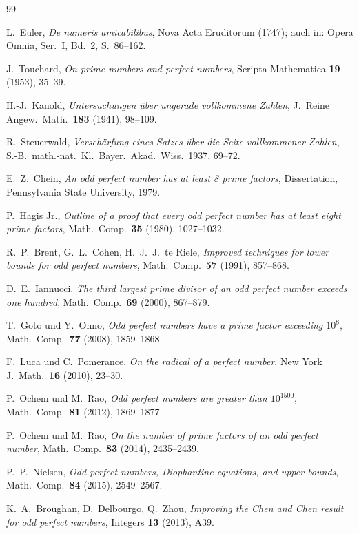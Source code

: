 \documentclass[12pt,a4paper]{amsart}
\theoremstyle{definition}
\theoremstyle{remark}
\begin{document}
\begin{thebibliography}{99}

L.\ Euler,
\textit{De numeris amicabilibus},
Nova Acta Eruditorum (1747);
auch in: Opera Omnia, Ser.\ I, Bd.\ 2, S.\ 86--162.

J.\ Touchard,
\textit{On prime numbers and perfect numbers},
Scripta Mathematica \textbf{19} (1953), 35--39.

H.-J.\ Kanold,
\textit{Untersuchungen über ungerade vollkommene Zahlen},
J.\ Reine Angew.\ Math.\ \textbf{183} (1941), 98--109.

R.\ Steuerwald,
\textit{Verschärfung eines Satzes über die Seite vollkommener Zahlen},
S.-B.\ math.-nat.\ Kl.\ Bayer.\ Akad.\ Wiss.\ 1937, 69--72.

E.\ Z.\ Chein,
\textit{An odd perfect number has at least 8 prime factors},
Dissertation, Pennsylvania State University, 1979.

P.\ Hagis Jr.,
\textit{Outline of a proof that every odd perfect number has at least eight
prime factors},
Math.\ Comp.\ \textbf{35} (1980), 1027--1032.

R.\ P.\ Brent, G.\ L.\ Cohen, H.\ J.\ J.\ te Riele,
\textit{Improved techniques for lower bounds for odd perfect numbers},
Math.\ Comp.\ \textbf{57} (1991), 857--868.

D.\ E.\ Iannucci,
\textit{The third largest prime divisor of an odd perfect number exceeds
one hundred},
Math.\ Comp.\ \textbf{69} (2000), 867--879.

T.\ Goto und Y.\ Ohno,
\textit{Odd perfect numbers have a prime factor exceeding $10^8$},
Math.\ Comp.\ \textbf{77} (2008), 1859--1868.

F.\ Luca und C.\ Pomerance,
\textit{On the radical of a perfect number},
New York J.\ Math.\ \textbf{16} (2010), 23--30.

P.\ Ochem und M.\ Rao,
\textit{Odd perfect numbers are greater than $10^{1500}$},
Math.\ Comp.\ \textbf{81} (2012), 1869--1877.

P.\ Ochem und M.\ Rao,
\textit{On the number of prime factors of an odd perfect number},
Math.\ Comp.\ \textbf{83} (2014), 2435--2439.

P.\ P.\ Nielsen,
\textit{Odd perfect numbers, Diophantine equations, and upper bounds},
Math.\ Comp.\ \textbf{84} (2015), 2549--2567.

K.\ A.\ Broughan, D.\ Delbourgo, Q.\ Zhou,
\textit{Improving the Chen and Chen result for odd perfect numbers},
Integers \textbf{13} (2013), A39.

\end{thebibliography}
\end{document}
